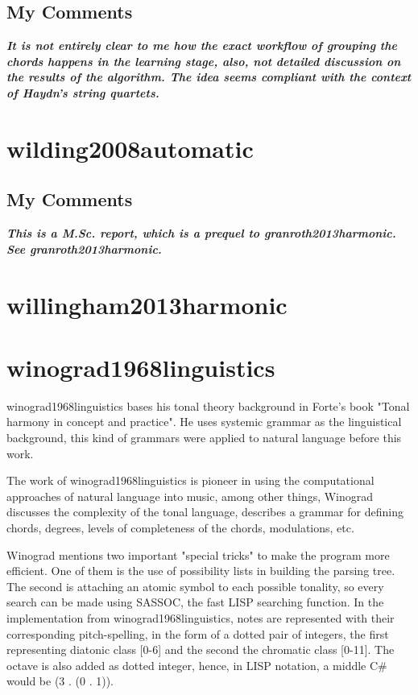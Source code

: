 		\subsection{My Comments}
			\emph{\textbf{
				It is not entirely clear to me how the exact workflow of grouping the chords happens in the learning stage, also, not detailed discussion on the results of the algorithm. The idea seems compliant with the context of Haydn's string quartets.
			}}
	\section{wilding2008automatic }
		\subsection{My Comments}
			\emph{\textbf{
				This is a M.Sc. report, which is a prequel to granroth2013harmonic. See granroth2013harmonic.
			}}
	\section{willingham2013harmonic }
	\section{winograd1968linguistics }
		winograd1968linguistics bases his tonal theory background in Forte's book "Tonal harmony in concept and practice". He uses systemic grammar as the linguistical background, this kind of grammars were applied to natural language before this work.

		The work of winograd1968linguistics is pioneer in using the computational approaches of natural language into music, among other things, Winograd discusses the complexity of the tonal language, describes a grammar for defining chords, degrees, levels of completeness of the chords, modulations, etc.

		Winograd mentions two important "special tricks" to make the program more efficient. One of them is the use of possibility lists in building the parsing tree. The second is attaching an atomic symbol to each possible tonality, so every search can be made using SASSOC, the fast LISP searching function. In the implementation from winograd1968linguistics, notes are represented with their corresponding pitch-spelling, in the form of a dotted pair of integers, the first representing diatonic class [0-6] and the second the chromatic class [0-11]. The octave is also added as dotted integer, hence, in LISP notation, a middle C# would be (3 . (0 . 1)).

